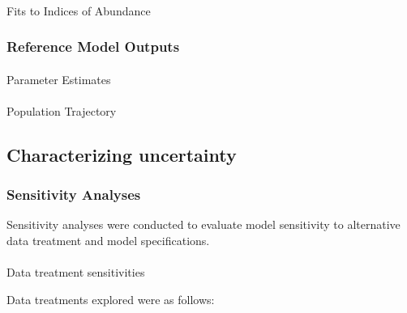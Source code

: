 \documentclass[
]{scrartcl}
\makeatletter
\let\oldparagraph\paragraph
\renewcommand{\paragraph}{
    \@ifstar
      \xxxParagraphStar
      \xxxParagraphNoStar
  }
\newcommand{\xxxParagraphStar}[1]{\oldparagraph*{#1}\mbox{}}
\newcommand{\xxxParagraphNoStar}[1]{\oldparagraph{#1}\mbox{}}
\makeatother
\begin{document}
\paragraph{Fits to Indices of
Abundance}\label{fits-to-indices-of-abundance}

\subsubsection{Reference Model Outputs}\label{reference-model-outputs}

\paragraph{Parameter Estimates}\label{parameter-estimates}

\paragraph{Population Trajectory}\label{population-trajectory}

\newpage{}

\subsection{Characterizing
uncertainty}\label{characterizing-uncertainty}

\subsubsection{Sensitivity Analyses}\label{sec-assmt-sens}

Sensitivity analyses were conducted to evaluate model sensitivity to
alternative data treatment and model specifications.

\paragraph{Data treatment
sensitivities}\label{data-treatment-sensitivities}

Data treatments explored were as follows:
\end{document}
